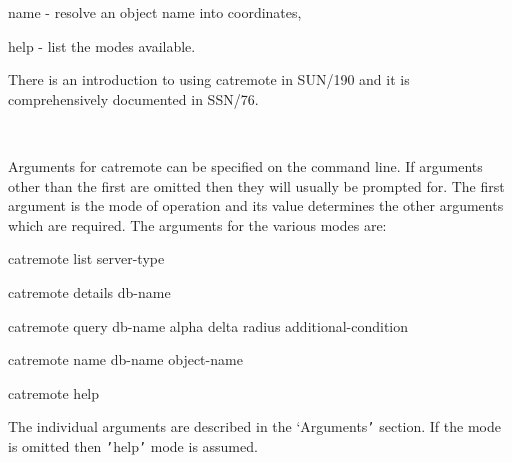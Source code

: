\documentclass[twoside,11pt]{article}
\renewcommand{\_}{\texttt{\symbol{95}}}
\newcommand{\sstusage}[1]{\item[Usage:] \mbox{}
\\[1.3ex]{\raggedright \ssttt #1}}
\newcommand{\sstusage}[1]{\item[Usage:]
      \begin{description}
         {\ssttt #1}
      \end{description}
      \\
   }
\begin{document}
\begin{htmlonly}
{{      name    - resolve an object name into coordinates,

      help    - list the modes available.

      There is an introduction to using catremote in SUN/190 and it is
      comprehensively documented in SSN/76.
   }
   \sstusage{
      Arguments for catremote can be specified on the command line.
      If arguments other than the first are omitted then they will usually
      be prompted for.  The first argument is the mode of operation and
      its value determines the other arguments which are required.  The
      arguments for the various modes are:

       catremote list    server-type

       catremote details db-name

       catremote query   db-name alpha delta radius additional-condition

       catremote name    db-name object-name

       catremote help

      The individual arguments are described in the `Arguments{\tt '} section.
      If the mode is omitted then  {\tt '}help{\tt '} mode is assumed.

}}
\end{htmlonly}
\end{document}
